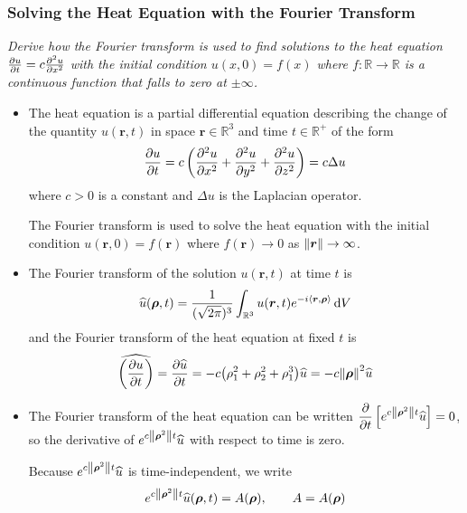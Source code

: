 \documentclass[11pt, a4paper]{article}
\newcommand{\question}[1]{\textit{#1}\vspace{2mm}}
\newcommand{\R}{\mathbb{R}} %
\newcommand{\diff}{\mathop{}\!\mathrm{d}} %
\begin{document}
\subsubsection{Solving the Heat Equation with the Fourier Transform}
\question{Derive how the Fourier transform is used to find solutions to the heat equation $ \pdv{u}{t} = c \pdv[2]{u}{x} $ with the initial condition $ u(x, 0) = f(x) $ where $ f: \R \to \R $ is a continuous function that falls to zero at $ \pm \infty $.}
\begin{itemize}
	\item
	The heat equation is a partial differential equation describing the change of the quantity $ u(\bm{r}, t) $ in space $ \bm{r} \in \R^{3} $ and time $ t \in \R^+ $ of the form
	\begin{equation*}
		\pdv{u}{t} = c \left(\pdv[2]{u}{x} + \pdv[2]{u}{y} + \pdv[2]{u}{z}\right) = c \Delta u
	\end{equation*}
	where $ c > 0 $ is a constant and $ \Delta u $ is the Laplacian operator.
	
	The Fourier transform is used to solve the heat equation with the initial condition $ u(\bm{r}, 0) = f(\bm{r}) $ where $ f(\bm{r}) \to 0 $ as $ \norm{\bm{r}} \to \infty $. 
	
	\item The Fourier transform of the solution $ u(\bm{r}, t) $ at time $ t $ is
	\begin{equation*}
		\widehat{u}(\bm{\rho}, t) = \frac{1}{(\sqrt{2\pi})^3} \int_{\R^3} u(\bm{r}, t)e^{-i\expval{\bm{r}, \bm{\rho}}} \diff V
	\end{equation*}
	and the Fourier transform of the heat equation at fixed $ t $ is
	\begin{equation*}
		\widehat{\left(\pdv{u}{t}\right)} = \pdv{\widehat{u}}{t} = -c \big(\rho_{1}^{2} + \rho_{2}^{2} + \rho_{1}^{3}\big)\widehat{u} =- c \norm{\bm{\rho}}^2 \widehat{u}
	\end{equation*}
	
	\item The Fourier transform of the heat equation can be written $ \displaystyle{\pdv{}{t} \left[e^{c\norm{\bm{\rho}^2}t } \widehat{u}\right] = 0} $, so the derivative of $ e^{c\norm{\bm{\rho}^2}t } \widehat{u} $ with respect to time is zero. 
	
	Because $ e^{c\norm{\bm{\rho}^2}t } \widehat{u} $ is time-independent, we write
	\begin{equation}
		e^{c\norm{\bm{\rho}^2}t } \widehat{u}(\bm{\rho}, t) = A(\bm{\rho}), \qquad A = A(\bm{\rho}) \label{ft:eq:ft_constant}
	\end{equation}
	

\end{itemize}
\end{document}
